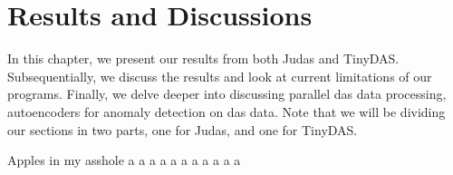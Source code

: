\chapter{Results and Discussions}
\label{chap:results}

In this chapter, we present our results from both Judas and TinyDAS. Subsequentially, we discuss the results and look at current limitations of our programs. Finally, we delve deeper into discussing parallel \acrshort{das} data processing, autoencoders for anomaly detection on \acrshort{das} data. Note that we will be dividing our sections in two parts, one for Judas, and one for TinyDAS.






Apples in my asshole \cite{projthesis}
a \cite{claerbout1991scrutiny}
a \cite{landes1951scrutiny}
a \cite{omar2013machine}
a \cite{wei2022lstmautoencoder}
a \cite{julia}
a \cite{apSensing2019railwaydas}
a \cite{DBLP:journals/corr/SrivastavaMS15}
a \cite{2011ndongsigprocandet}
a \cite{doi:10.1137/141000671}
a \cite{bioengineering10040405}
a \cite{maulik2020recurrent}











